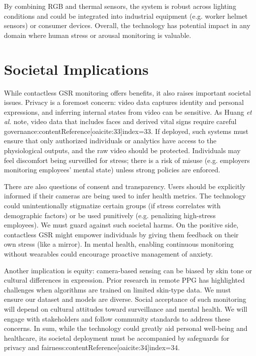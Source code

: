 \documentclass[12pt]{article}
\begin{document}
    By combining RGB and thermal sensors, the system is robust across lighting conditions and could be integrated into industrial equipment (e.g. worker helmet sensors) or consumer devices. Overall, the technology has potential impact in any domain where human stress or arousal monitoring is valuable.


    \section{Societal Implications}
    While contactless GSR monitoring offers benefits, it also raises important societal issues. Privacy is a foremost concern: video data captures identity and personal expressions, and inferring internal states from video can be sensitive. As Huang \emph{et al.} note, video data that includes faces and derived vital signs require careful governance:contentReference[oaicite:33]{index=33}. If deployed, such systems must ensure that only authorized individuals or analytics have access to the physiological outputs, and the raw video should be protected. Individuals may feel discomfort being surveilled for stress; there is a risk of misuse (e.g. employers monitoring employees’ mental state) unless strong policies are enforced.

    There are also questions of consent and transparency. Users should be explicitly informed if their cameras are being used to infer health metrics. The technology could unintentionally stigmatize certain groups (if stress correlates with demographic factors) or be used punitively (e.g. penalizing high-stress employees). We must guard against such societal harms. On the positive side, contactless GSR might empower individuals by giving them feedback on their own stress (like a mirror). In mental health, enabling continuous monitoring without wearables could encourage proactive management of anxiety.

    Another implication is equity: camera-based sensing can be biased by skin tone or cultural differences in expression. Prior research in remote PPG has highlighted challenges when algorithms are trained on limited skin-type data. We must ensure our dataset and models are diverse. Social acceptance of such monitoring will depend on cultural attitudes toward surveillance and mental health. We will engage with stakeholders and follow community standards to address these concerns. In sum, while the technology could greatly aid personal well-being and healthcare, its societal deployment must be accompanied by safeguards for privacy and fairness:contentReference[oaicite:34]{index=34}.
\end{document}
